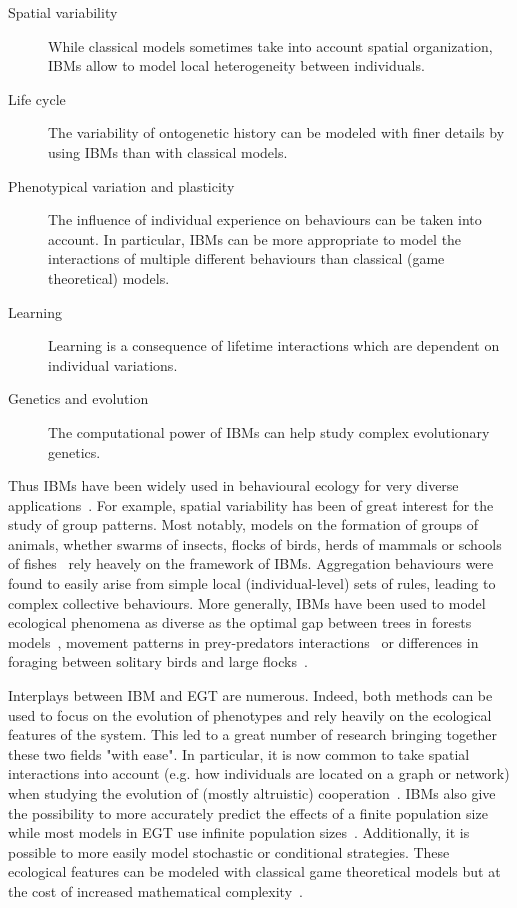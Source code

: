     \begin{description}
        \item[Spatial variability] {While classical models sometimes take into account spatial organization, IBMs allow to model local heterogeneity between individuals.}
        \item[Life cycle] {The variability of ontogenetic history can be modeled with finer details by using IBMs than with classical models.}
        \item[Phenotypical variation and plasticity] {The influence of individual experience on behaviours can be taken into account. In particular, IBMs can be more appropriate to model the interactions of multiple different behaviours than classical (game theoretical) models.}
        \item[Learning] {Learning is a consequence of lifetime interactions which are dependent on individual variations.}
        \item[Genetics and evolution] {The computational power of IBMs can help study complex evolutionary genetics.}
    \end{description}

    Thus IBMs have been widely used in behavioural ecology for very diverse applications~\parencite{DeAngelis2005}. For example, spatial variability has been of great interest for the study of group patterns. Most notably, models on the formation of groups of animals, whether swarms of insects, flocks of birds, herds of mammals or schools of fishes~\parencite{Huth1992, Reynolds1992, Gueron1996, Couzin2002} rely heavely on the framework of IBMs. Aggregation behaviours were found to easily arise from simple local (individual-level) sets of rules, leading to complex collective behaviours. More generally, IBMs have been used to model ecological phenomena as diverse as the optimal gap between trees in forests models~\parencite{Botkin1972}, movement patterns in prey-predators interactions~\parencite{Smith1991} or differences in foraging between solitary birds and large flocks~\parencite{Toquenaga1995}.


    Interplays between IBM and EGT are numerous. Indeed, both methods can be used to focus on the evolution of phenotypes and rely heavily on the ecological features of the system. This led to a great number of research bringing together these two fields "with ease". In particular, it is now common to take spatial interactions into account (e.g. how individuals are located on a graph or network) when studying the evolution of (mostly altruistic) cooperation~\parencite{Hauert2004}. IBMs also give the possibility to more accurately predict the effects of a finite population size while most models in EGT use infinite population sizes~\parencite{Hauert2009}. Additionally, it is possible to more easily model stochastic or conditional strategies. These ecological features can be modeled with classical game theoretical models but at the cost of increased mathematical complexity~\parencite{Hauert2009}. 

